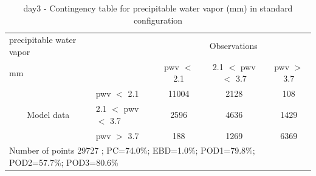 \begin{table}[p!]
\begin{center}
\begin{tabular}{llccc}
\hline
{precipitable water vapor}                                       &                                                    & \multicolumn{3}{c}{Observations}                 \\
{mm}                                       &                             & pwv $<$ 2.1   & 2.1 $<$ pwv $<$ 3.7 & pwv $>$ 3.7 \\
\hline
\multicolumn{1}{c}{\multirow{3}{*}{Model data}}  & pwv $<$ 2.1             & 11004                & 2128                       & 108              \\
                                                 & 2.1  $<$ pwv $<$ 3.7 & 2596                & 4636                       & 1429              \\
                                                 & pwv $>$ 3.7             & 188                & 1269                       & 6369              \\
\hline
\multicolumn{5}{l}{ Number of points        29727 ; PC=74.0\%; EBD=1.0\%; POD1=79.8\%; POD2=57.7\%; POD3=80.6\%}                 \\
\end{tabular}
\end{center}
\caption{day3 - Contingency table for  precipitable water vapor (mm) in standard configuration  }
\label{tab:contingencypwvBEF:day3}
\end{table}
